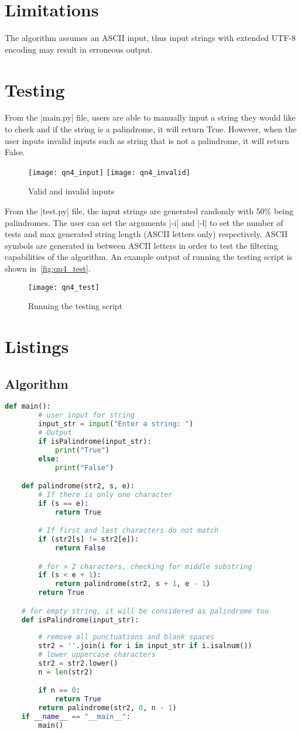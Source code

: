 \documentclass{report}
\begin{document}
\section{Limitations}
The algorithm assumes an ASCII input, thus input strings with extended UTF-8 encoding may result in erroneous output.
\section{Testing}
From the |main.py| file, users are able to manually input a string they would like to check and if the string is a palindrome, it will return True. However, when the user inputs invalid inputs such as string that is not a palindrome, it will return False.
\begin{figure}[H]
	\centering
	\caption{Valid and invalid inputs}
	\texttt{[image: qn4\_input]}
	\texttt{[image: qn4\_invalid]}
	\label{fig:qn4_input}
\end{figure}
From the |test.py| file, the input strings are generated randomly with 50\% being palindromes. The user can set the arguments |-i| and |-l| to set the number of tests and max generated string length (ASCII letters only) respectively. ASCII symbols are generated in between ASCII letters in order to test the filtering capabilities of the algorithm. An example output of running the testing script is shown in~\autoref{fig:qn4_test}.
\begin{figure}[H]
	\centering
	\caption{Running the testing script}
	\texttt{[image: qn4\_test]}
	\label{fig:qn4_test}
\end{figure}

\section{Listings}
\subsection{Algorithm}
\begin{lstlisting}[language=python]
	def main():
		# user input for string
		input_str = input("Enter a string: ")
		# Output
		if isPalindrome(input_str):
			print("True")
		else:
			print("False")

	def palindrome(str2, s, e):
		# If there is only one character
		if (s == e):
			return True

		# If first and last characters do not match
		if (str2[s] != str2[e]):
			return False

		# for > 2 characters, checking for middle substring
		if (s < e + 1):
			return palindrome(str2, s + 1, e - 1)
		return True

	# for empty string, it will be considered as palindrome too
	def isPalindrome(input_str):
		
		# remove all punctuations and blank spaces
		str2 = ''.join(i for i in input_str if i.isalnum())
		# lower uppercase characters
		str2 = str2.lower()
		n = len(str2)

		if n == 0:
			return True
		return palindrome(str2, 0, n - 1)
	if __name__ == "__main__":
		main()
\end{lstlisting}
\end{document}
